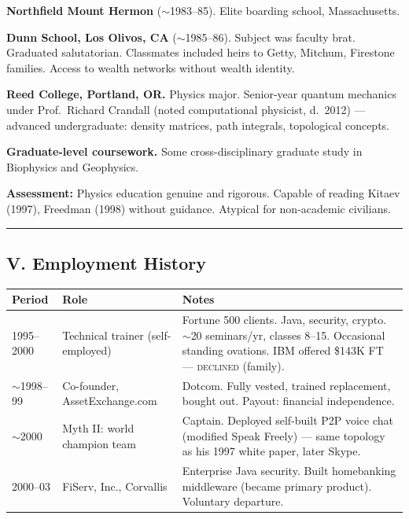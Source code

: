 \textbf{Northfield Mount Hermon} ($\sim$1983--85). Elite boarding school, Massachusetts.

\textbf{Dunn School, Los Olivos, CA} ($\sim$1985--86). Subject was faculty brat. Graduated salutatorian. Classmates included heirs to Getty, Mitchum, Firestone families. Access to wealth networks without wealth identity.

\textbf{Reed College, Portland, OR.} Physics major. Senior-year quantum mechanics under Prof.\ Richard Crandall (noted computational physicist, d.\ 2012) --- advanced undergraduate: density matrices, path integrals, topological concepts.

\textbf{Graduate-level coursework.} Some cross-disciplinary graduate study in Biophysics and Geophysics.

\textbf{Assessment:} Physics education genuine and rigorous. Capable of reading Kitaev (1997), Freedman (1998) without guidance. Atypical for non-academic civilians.

\vspace{1cm}\hrule\vspace{1cm}

\subsection*{V. Employment History}
\label{interlude:employment-history}

{%
\small
\begin{tabular}{p{2.5cm} p{4cm} p{7cm}}
\hline
\textbf{Period} & \textbf{Role} & \textbf{Notes} \\
\hline
1995--2000 & Technical trainer (self-employed) & Fortune 500 clients. Java, security, crypto. $\sim$20 seminars/yr, classes 8--15. Occasional standing ovations. IBM offered \$143K FT --- \textsc{declined} (family). \\
$\sim$1998--99 & Co-founder, AssetExchange.com & Dotcom. Fully vested, trained replacement, bought out. Payout: financial independence. \\
$\sim$2000 & Myth II: world champion team & Captain. Deployed self-built P2P voice chat (modified Speak Freely) --- same topology as his 1997 white paper, later Skype. \\
2000--03 & FiServ, Inc., Corvallis & Enterprise Java security. Built homebanking middleware (became primary product). Voluntary departure. \\
\hline
\end{tabular}
}%

\medskip

